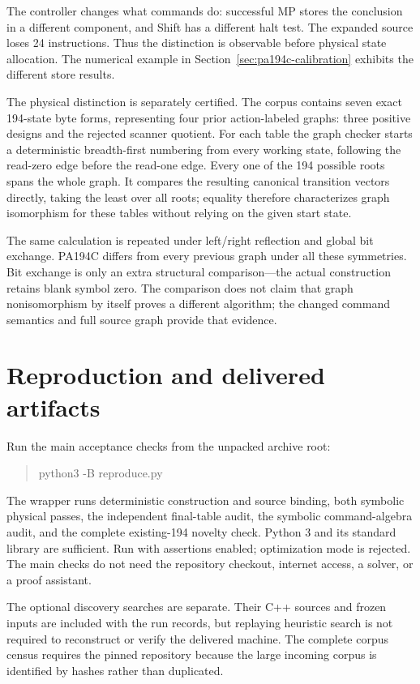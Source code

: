 \documentclass[11pt,letterpaper]{article}
\begin{document}
The controller changes what commands do: successful MP stores the
conclusion in a different component, and Shift has a different halt test.
The expanded source loses 24 instructions. Thus the distinction is
observable before physical state allocation. The numerical example in
Section~\ref{sec:pa194c-calibration} exhibits the different store results.

The physical distinction is separately certified. The corpus contains
seven exact 194-state byte forms, representing four prior action-labeled
graphs: three positive designs and the rejected scanner quotient. For each
table the graph checker starts a deterministic breadth-first numbering
from every working state, following the read-zero edge before the read-one
edge. Every one of the 194 possible roots spans the whole graph. It compares
the resulting canonical transition vectors directly, taking the least
over all roots; equality therefore characterizes graph isomorphism for
these tables without relying on the given start state.

The same calculation is repeated under left/right reflection and global
bit exchange. PA194C differs from every previous graph under all these
symmetries. Bit exchange is only an extra structural comparison---the
actual construction retains blank symbol zero. The comparison does not
claim that graph nonisomorphism by itself proves a different algorithm;
the changed command semantics and full source graph provide that evidence.



\section{Reproduction and delivered artifacts}
\label{sec:reproduction}

Run the main acceptance checks from the unpacked archive root:
\begin{quote}\ttfamily\small
python3 -B reproduce.py
\end{quote}
The wrapper runs deterministic construction and source binding, both
symbolic physical passes, the independent final-table audit, the
symbolic command-algebra audit, and the complete existing-194 novelty check.
Python 3 and its standard library are sufficient. Run with assertions
enabled; optimization mode is rejected. The main checks do not need the
repository checkout, internet access, a solver, or a proof assistant.

The optional discovery searches are separate. Their C++ sources and
frozen inputs are included with the run records, but replaying heuristic
search is not required to reconstruct or verify the delivered machine.
The complete corpus census requires the pinned repository because the
large incoming corpus is identified by hashes rather than duplicated.
\end{document}
